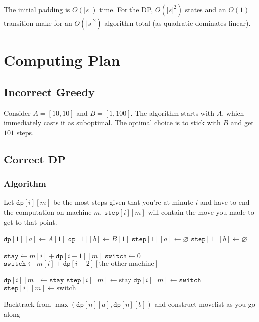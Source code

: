 \documentclass[12pt]{article}
\begin{document}
The initial padding is $O(|s|)$ time.
For the DP, $O(|s|^2)$ states and an $O(1)$ transition make
for an $\boxed{O(|s|^2)}$ algorithm total (as quadratic dominates linear).

\pagebreak

\section{Computing Plan}

\subsection{Incorrect Greedy}

Consider $A=[10, 10]$ and $B=[1, 100]$.
The algorithm starts with $A$, which immediately casts it as suboptimal.
The optimal choice is to stick with $B$ and get $101$ steps.

\subsection{Correct DP}

\subsubsection{Algorithm}

Let $\texttt{dp}[i][m]$ be the most steps given that you're at minute $i$
and have to end the computation on machine $m$.
$\texttt{step}[i][m]$ will contain the move you made to get to that point.

\begin{algorithmic}[1]
    \State $\texttt{dp}[1][a] \gets A[1]$
    \State $\texttt{dp}[1][b] \gets B[1]$
    \State $\texttt{step}[1][a] \gets \varnothing$
    \State $\texttt{step}[1][b] \gets \varnothing$

    \item[]
            \State $\texttt{stay} \gets m[i]+\texttt{dp}[i-1][m]$
            \State $\texttt{switch} \gets 0$
                \State $\texttt{switch} \gets m[i]+\texttt{dp}[i-2][\text{the other machine}]$
            \EndIf

            \item[]
                \State $\texttt{dp}[i][m] \gets \texttt{stay}$
                \State $\texttt{step}[i][m] \gets \text{stay}$
            \Else
                \State $\texttt{dp}[i][m] \gets \texttt{switch}$
                \State $\texttt{step}[i][m] \gets \text{switch}$
            \EndIf
        \EndFor
    \EndFor

    \item[]
    \State Backtrack from $\max(\texttt{dp}[n][a], \texttt{dp}[n][b])$ and construct movelist as you go along
\end{algorithmic}
\end{document}

